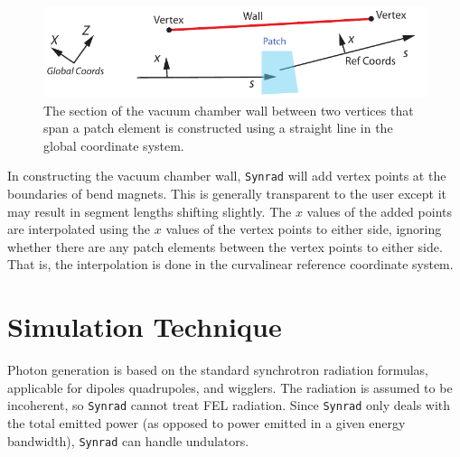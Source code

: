 \documentclass[11pt]{article}
\newcommand{\syn}{\texttt{Synrad}\xspace}
\begin{document}

  \begin{figure}[tb]
  \begin{center}
  \includegraphics[width=5in]{patch.pdf}
  \caption{
The section of the vacuum chamber wall between two
vertices that span a patch element is constructed using
a straight line in the global coordinate system.
  }
  \label{f:patch}
  \end{center}
  \end{figure}


In constructing the vacuum chamber wall, \syn will add vertex points
at the boundaries of bend magnets. This is generally transparent to
the user except it may result in segment lengths shifting slightly.
The $x$ values of the added points are interpolated using the $x$
values of the vertex points to either side, ignoring whether there are
any patch elements between the vertex points to either side. That is,
the interpolation is done in the curvalinear reference coordinate
system.

\section{Simulation Technique} 

Photon generation is based on the standard synchrotron radiation
formulas, applicable for dipoles quadrupoles, and wigglers. The
radiation is assumed to be incoherent, so \syn cannot treat FEL
radiation. Since \syn only deals with the total emitted power (as
opposed to power emitted in a given energy bandwidth), \syn can
handle undulators.
\end{document}
